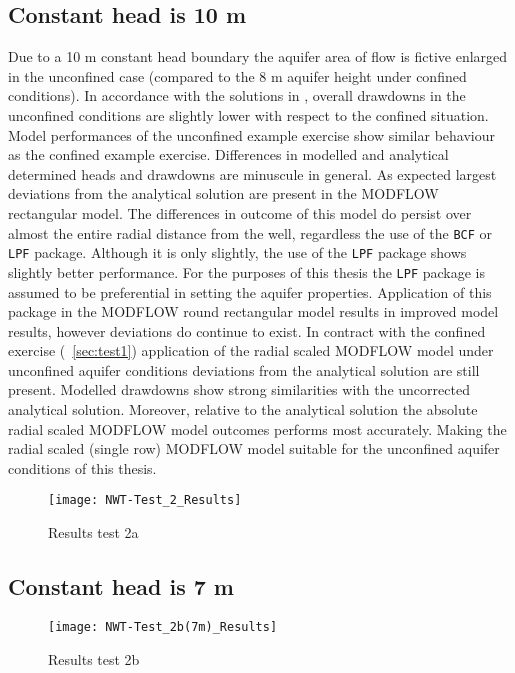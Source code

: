 \subsection{Constant head is 10 m}
Due to a 10 m constant head boundary the aquifer area of flow is fictive enlarged in the unconfined case (compared to the 8 m aquifer height under confined conditions). In accordance with the solutions in \citet{Langevin2008}, overall drawdowns in the unconfined conditions are slightly lower with respect to the confined situation. 
\bigskip
Model performances of the unconfined example exercise show similar behaviour as the confined example exercise. Differences in modelled and analytical determined heads and drawdowns are minuscule in general. As expected largest deviations from the analytical solution are present in the MODFLOW rectangular model. The differences in outcome of this model do persist over almost the entire radial distance from the well, regardless the use of the \texttt{BCF} or \texttt{LPF} package. Although it is only slightly, the use of the \texttt{LPF} package shows slightly better performance. For the purposes of this thesis the \texttt{LPF} package is assumed to be preferential in setting the aquifer properties. Application of this package in the MODFLOW round rectangular model results in improved model results, however deviations do continue to exist. In contract with the confined exercise (~\ref{sec:test1}) application of the radial scaled MODFLOW model under unconfined aquifer conditions  deviations from the analytical solution are still present. Modelled drawdowns show strong similarities with the uncorrected analytical solution. Moreover, relative to the analytical solution the absolute radial scaled MODFLOW model outcomes performs most accurately. Making the radial scaled (single row) MODFLOW model suitable for the unconfined aquifer conditions of this thesis.   

\begin{figure}[h!]
 \centering\texttt{[image: NWT-Test\_2\_Results]}
 \captionsetup{justification=centering}
 \caption{Results test 2a}
 \label{fig:Test2a_results}
\end{figure} 

\subsection{Constant head is 7 m}

\begin{figure}[h!]
 \centering\texttt{[image: NWT-Test\_2b(7m)\_Results]}
 \captionsetup{justification=centering}
 \caption{Results test 2b}
 \label{fig:Test2b_results}
\end{figure} 

